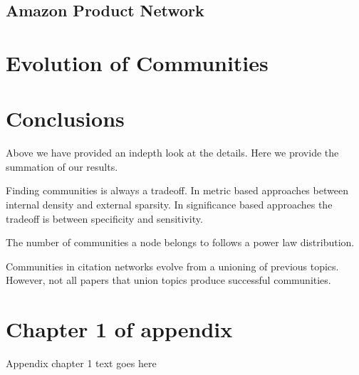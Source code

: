 \documentclass[phd,tocprelim]{cornell}
\begin{document}
\section{Amazon Product Network}

\chapter{Evolution of Communities}


\chapter{Conclusions}

Above we have provided an indepth look at the details.  Here we provide the summation of our results.

Finding communities is always a tradeoff.  In metric based approaches between internal density and external sparsity.  In significance based approaches the tradeoff is between specificity and sensitivity.

The number of communities a node belongs to follows a power law distribution.

Communities in citation networks evolve from a unioning of previous topics.  However, not all papers that union topics produce successful communities.

\cite{fort}
\cite{porter}
\cite{kanna}
\cite{newman}
\cite{duch}
\cite{blondel}
\cite{mishra}
\cite{jain}
\cite{zhang}
\cite{andersen}
\cite{capocci}
\cite{lanc:2009}
\cite{danon}
\cite{leskovec}
\cite{hui}
\cite{maiya}
\cite{lan:2008}
\cite{hastings}
\cite{leskovec:2008}
\cite{chen}
\cite{lanc:2010}
\cite{girvan}


\appendix
\chapter{Chapter 1 of appendix}
Appendix chapter 1 text goes here


\end{document}
